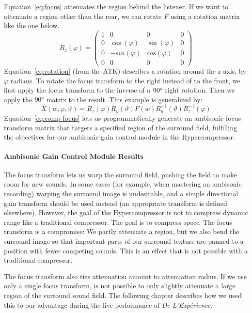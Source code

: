 Equation~\ref{eq:focus} attenuates the region behind the listener. 
If we want to attenuate a region other than the rear, we can rotate
$F$ using a rotation matrix like the one below.
\begin{equation}
R_z(\varphi)=\left( \begin{array}{cccc}
1 & 0 & 0 & 0 \\
0 & \cos(\varphi) & \sin(\varphi) & 0 \\
0 & -sin(\varphi) & cos(\varphi) & 0 \\
0 & 0 & 0 & 0
\end{array} \right)
\label{eq:rotation}
\end{equation}
Equation~\ref{eq:rotation} (from the ATK) describes a rotation around
the z-axis, by $\varphi$ radians. To rotate the focus transform to the
right instead of to the front, we first apply the focus transform to
the inverse of a $90\degree$ right rotation. Then we apply the
$90\degree$ matrix to the result. This example is generalized by:
\begin{equation}
X(w,\varphi,\vartheta)=R_z(\varphi)R_y(\vartheta)F(w) R_y^{-1}(\vartheta)R_z^{-1}(\varphi)
\label{eq:comp-focus}
\end{equation}
Equation~\ref{eq:comp-focus} lets us programmatically generate an
ambisonic focus transform matrix that targets a specified region of
the surround field, fulfilling the objectives for our ambisonic gain
control module in the Hypercompressor.

\paragraph{Ambisonic Gain Control Module Results}
The focus transform lets us warp the surround field, pushing the
field to make room for new sounds. In some cases (for example, when
mastering an ambisonic recording) warping the surround image is
undesirable, and a simple directional gain transform should be used
instead (an appropriate transform is defined
elsewhere\cite{Kronlachner2014i}). However, the goal of the
Hypercompressor is not to compress dynamic range like a traditional
compressor. The goal is to compress \emph{space}. The focus transform
is a compromise: We partly attenuate a region, but we also bend the
surround image so that important parts of our surround texture are
panned to a position with fewer competing sounds. This is an effect
that is not possible with a traditional compressor.

The focus transform also ties attenuation amount to attenuation
radius. If we use only a single focus transform, is not possible to only
slightly attenuate a large region of the surround sound field. The
following chapter describes how we used this to our advantage
during the live performance of \textit{De L'Exp\'{e}rience}.

